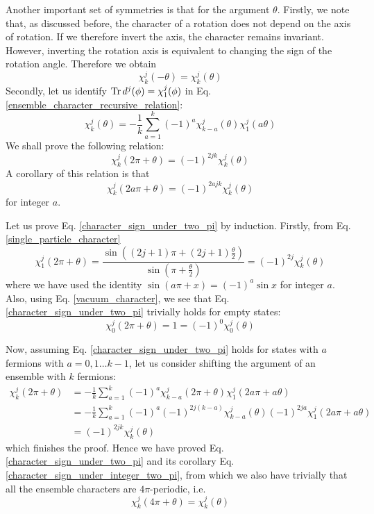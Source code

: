 \documentclass[12pt]{article}
\begin{document}
	Another important set of symmetries is that for the argument $\theta$. Firstly, we note that, as discussed before, the character of a rotation does not depend on the axis of rotation. If we therefore invert the axis, the character remains invariant. However, inverting the rotation axis is equivalent to changing the sign of the rotation angle. Therefore we obtain
	\begin{equation} \label{flip_angle_sign}
	\chi^j_k(-\theta)=\chi^j_k(\theta)
	\end{equation}
	Secondly, let us identify $\Tr d^j(\phi)=\chi^j_1(\phi)$ in Eq. \ref{ensemble_character_recursive_relation}:
	\begin{equation}
	\chi^j_k(\theta)=-\frac{1}{k}\sum_{a=1}^k (-1)^{a}\chi^j_{k-a}(\theta)\chi^j_1(a\theta)
	\end{equation}
	We shall prove the following relation:
	\begin{equation} \label{character_sign_under_two_pi}
	\chi^j_k(2\pi+\theta)=(-1)^{2jk}\chi^j_k(\theta)
	\end{equation}
	A corollary of this relation is that
	\begin{equation} \label{character_sign_under_integer_two_pi}
	\chi^j_k(2a\pi+\theta)=(-1)^{2ajk}\chi^j_k(\theta)
	\end{equation}
	for integer $a$.
	
	Let us prove Eq. \ref{character_sign_under_two_pi} by induction. Firstly, from Eq. \ref{single_particle_character}
	\begin{equation}
	\chi^j_1(2\pi+\theta)=\frac{\sin((2j+1)\pi+(2j+1)\frac{\theta}{2})}{\sin(\pi +\frac{\theta}{2})}=(-1)^{2j}\chi^j_k(\theta)
	\end{equation}
	where we have used the identity $\sin(a\pi+x)=(-1)^a\sin{x}$ for integer $a$. Also, using Eq. \ref{vacuum_character}, we see that Eq. \ref{character_sign_under_two_pi} trivially holds for empty states:
	\begin{equation}
	\chi^j_0(2\pi+\theta)=1=(-1)^0\chi^j_0(\theta)
	\end{equation}
	
	Now, assuming Eq. \ref{character_sign_under_two_pi} holds for states with $a$ fermions with $a=0,1\dots k-1$, let us consider shifting the argument of an ensemble with $k$ fermions:
	\begin{align}
	\chi^j_k(2\pi+\theta)&=-\frac{1}{k}\sum_{a=1}^k (-1)^{a}\chi^j_{k-a}(2\pi+\theta)\chi^j_1(2a\pi+a\theta)\nonumber\\
	&=-\frac{1}{k}\sum_{a=1}^k (-1)^{a}(-1)^{2j(k-a)}\chi^j_{k-a}(\theta)(-1)^{2ja}\chi^j_1(2a\pi+a\theta)\nonumber\\
	&=(-1)^{2jk}\chi^j_k(\theta) \label{shift_by_two_pi}
	\end{align}
	which finishes the proof. Hence we have proved Eq. \ref{character_sign_under_two_pi} and its corollary Eq. \ref{character_sign_under_integer_two_pi}, from which we also have trivially that all the ensemble characters are $4\pi$-periodic, i.e.
	\begin{equation} \label{character_four_pi_periodic}
	\chi^j_k(4\pi+\theta)=\chi^j_k(\theta)
	\end{equation}
	
\end{document}
